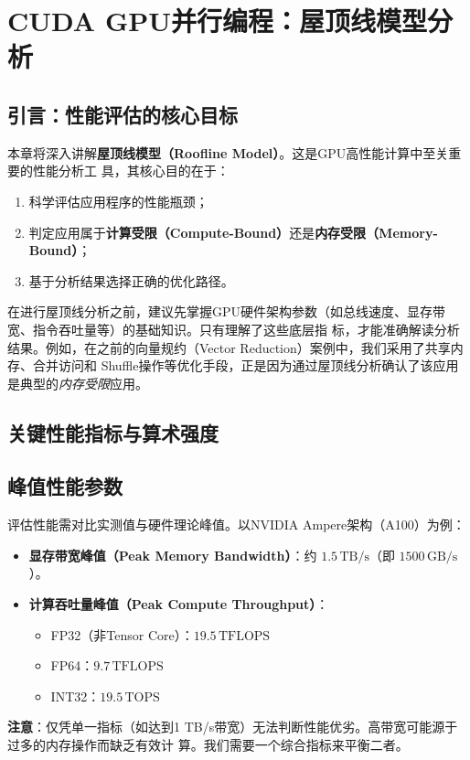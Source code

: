 \section{CUDA GPU并行编程：屋顶线模型分析}

\subsection{引言：性能评估的核心目标}

本章将深入讲解\textbf{屋顶线模型（Roofline Model）}。这是GPU高性能计算中至关重要的性能分析工
具，其核心目的在于：
\begin{enumerate}
    \item 科学评估应用程序的性能瓶颈；
    \item 判定应用属于\textbf{计算受限（Compute-Bound）}还是\textbf{内存受限（Memory-Bound）}；
    \item 基于分析结果选择正确的优化路径。
\end{enumerate}

在进行屋顶线分析之前，建议先掌握GPU硬件架构参数（如总线速度、显存带宽、指令吞吐量等）的基础知识。只有理解了这些底层指
标，才能准确解读分析结果。例如，在之前的向量规约（Vector Reduction）案例中，我们采用了共享内存、合并访问和
Shuffle操作等优化手段，正是因为通过屋顶线分析确认了该应用是典型的\textit{内存受限}应用。

\subsection{关键性能指标与算术强度}

\subsection{峰值性能参数}
评估性能需对比实测值与硬件理论峰值。以NVIDIA Ampere架构（A100）为例：
\begin{itemize}
    \item \textbf{显存带宽峰值（Peak Memory Bandwidth）}：约 $1.5\,\text{TB/s}$（即 $1500\,\text{GB/s}$）。
    \item \textbf{计算吞吐量峰值（Peak Compute Throughput）}：
    \begin{itemize}
        \item FP32（非Tensor Core）：$19.5\,\text{TFLOPS}$
        \item FP64：$9.7\,\text{TFLOPS}$
        \item INT32：$19.5\,\text{TOPS}$
    \end{itemize}
\end{itemize}
\textbf{注意}：仅凭单一指标（如达到1 TB/s带宽）无法判断性能优劣。高带宽可能源于过多的内存操作而缺乏有效计
算。我们需要一个综合指标来平衡二者。

